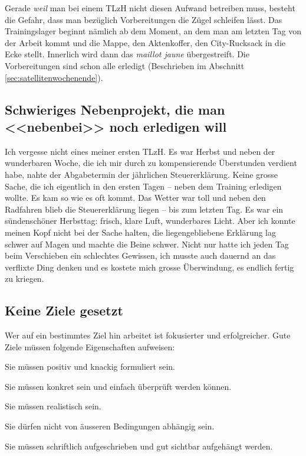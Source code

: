 \documentclass[a4paper,DIV13,BCOR0cm]{scrartcl}
\newcommand{\tlzh}{TLzH}
\begin{document}
Gerade \emph{weil} man bei einem \tlzh{} nicht diesen Aufwand betreiben muss, besteht die Gefahr,
dass man bezüglich Vorbereitungen die Zügel schleifen lässt.
Das Trainingslager beginnt nämlich ab dem Moment, an dem man am letzten Tag von der Arbeit kommt und
die Mappe, den Aktenkoffer, den City-Rucksack in die Ecke stellt.
Innerlich wird dann das \textsl{maillot jaune} übergestreift.
Die Vorbereitungen sind schon alle erledigt (Beschrieben im Abschnitt \ref{sec:satellitenwochenende}).

\subsection{Schwieriges Nebenprojekt, die man <<nebenbei>> noch erledigen will}

Ich vergesse nicht eines meiner ersten \tlzh{}. Es war Herbst und neben der wunderbaren Woche,
die ich mir durch zu kompensierende Überstunden verdient habe, nahte der Abgabetermin der jährlichen Steuererklärung.
Keine grosse Sache, die ich eigentlich in den ersten Tagen -- neben dem Training erledigen wollte.
Es kam so wie es oft kommt. Das Wetter war toll und neben den Radfahren blieb die Steuererklärung liegen -- bis zum letzten Tag.
Es war ein sündenschöner Herbsttag: frisch, klare Luft, wunderbares Licht.
Aber ich konnte meinen Kopf nicht bei der Sache halten, die liegengebliebene Erklärung lag schwer auf Magen und machte die Beine schwer.
Nicht nur hatte ich jeden Tag beim Verschieben ein schlechtes Gewissen,
ich musste auch dauernd an das verflixte Ding denken und es kostete mich grosse Überwindung, es endlich fertig zu kriegen.

\subsection{Keine Ziele gesetzt}

Wer auf ein bestimmtes Ziel hin arbeitet ist fokusierter und erfolgreicher.
Gute Ziele müssen folgende Eigenschaften aufweisen:

\begin{itemize*}
  \item Sie müssen positiv und knackig formuliert sein.
  \item Sie müssen konkret sein und einfach überprüft werden können.
  \item Sie müssen realistisch sein.
  \item Sie dürfen nicht von äusseren Bedingungen abhängig sein.
  \item Sie müssen schriftlich aufgeschrieben und gut sichtbar aufgehängt werden.
\end{itemize*}
\end{document}
